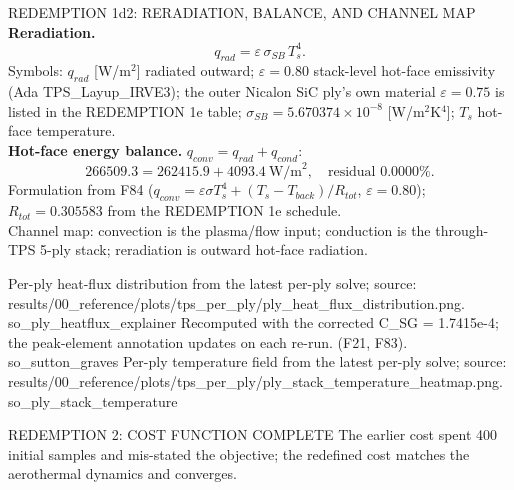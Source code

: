 \documentclass[aspectratio=169,11pt]{beamer}
\begin{document}
\begin{frame}{REDEMPTION 1d2: RERADIATION, BALANCE, AND CHANNEL MAP}
  \small
  \textbf{Reradiation.}
  \[
    q_{rad}=\varepsilon\,\sigma_{SB}\,T_s^4.
  \]
  Symbols: $q_{rad}$ [W/m$^2$] radiated outward; $\varepsilon=0.80$ stack-level
  hot-face emissivity (Ada TPS\_Layup\_IRVE3); the outer Nicalon SiC ply's own
  material $\varepsilon=0.75$ is listed in the REDEMPTION 1e table;
  $\sigma_{SB}=5.670374\times10^{-8}$ [W/m$^2$K$^4$]; $T_s$ hot-face
  temperature. \\

  \textbf{Hot-face energy balance.} $q_{conv}=q_{rad}+q_{cond}$:
  \[
    266509.3=262415.9+4093.4\ \text{W/m}^2,\quad
    \text{residual }0.0000\%.
  \]
  Formulation from F84 ($q_{conv}=\varepsilon\sigma T_s^4+(T_s-T_{back})/R_{tot}$,
  $\varepsilon=0.80$); $R_{tot}=0.305583$ from the REDEMPTION 1e schedule. \\

  Channel map: convection is the plasma/flow input; conduction is the
  through-TPS 5-ply stack; reradiation is outward hot-face radiation.
\end{frame}
  {%
   Per-ply heat-flux distribution from the latest per-ply solve; source:
   results/00\_reference/plots/tps\_per\_ply/ply\_heat\_flux\_distribution.png.}
  {so_ply_heatflux_explainer}
  {%
   Recomputed with the corrected C\_SG = 1.7415e-4; the peak-element
   annotation updates on each re-run. (F21, F83).}
  {so_sutton_graves}
  {%
   Per-ply temperature field from the latest per-ply solve; source:
   results/00\_reference/plots/tps\_per\_ply/ply\_stack\_temperature\_heatmap.png.}
  {so_ply_stack_temperature}
\begin{frame}{REDEMPTION 2: COST FUNCTION COMPLETE}
  The earlier cost spent 400 initial samples and mis-stated the objective;
  the redefined cost matches the aerothermal dynamics and converges.
\end{frame}
\end{document}
